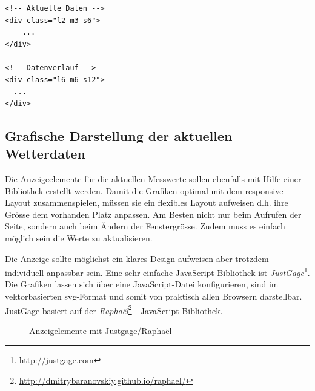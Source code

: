 \vspace{3mm}
\begin{lstlisting}[label=lst:kacheln,caption=Konfiguration der Anzahl Kacheln abhähngig von der Bildschirmgrösse, language=HTML5, style=htmlcssjs]
<!-- Aktuelle Daten -->
<div class="l2 m3 s6">
	...
</div>

<!-- Datenverlauf -->
<div class="l6 m6 s12">
  ...
</div>
\end{lstlisting}
\vspace{3mm}

\subsection{Grafische Darstellung der aktuellen Wetterdaten}
Die Anzeigeelemente für die aktuellen Messwerte sollen ebenfalls mit Hilfe einer Bibliothek erstellt werden. Damit die Grafiken optimal mit dem responsive Layout zusammenspielen, müssen sie ein flexibles Layout aufweisen d.h. ihre Grösse dem vorhanden Platz anpassen. Am Besten nicht nur beim Aufrufen der Seite, sondern auch beim Ändern der Fenstergrösse. Zudem muss es einfach möglich sein die Werte zu aktualisieren.

Die Anzeige sollte möglichst ein klares Design aufweisen aber trotzdem individuell anpassbar sein. Eine sehr einfache JavaScript-Bibliothek ist \textit{JustGage}\footnote{ \url{http://justgage.com}}. Die Grafiken lassen sich über eine JavaScript-Datei konfigurieren, sind im vektorbasierten svg-Format und somit von praktisch allen Browsern darstellbar. JustGage basiert auf der \textit{Raphaël}\footnote{ \url{http://dmitrybaranovskiy.github.io/raphael/}}—JavaScript Bibliothek.

\begin{figure}[h!]
	\centering
	\caption{Anzeigelemente mit Justgage/Raphaël}
	\label{img:gauges}
\end{figure}




